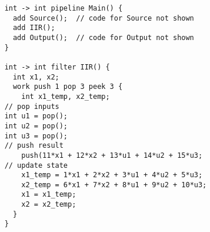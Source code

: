 \begin{singlespace}
\vspace{-12pt}
\begin{scriptsize}
\begin{verbatim}
    int -> int pipeline Main() {
      add Source();  // code for Source not shown
      add IIR();
      add Output();  // code for Output not shown
    }

    int -> int filter IIR() {
      int x1, x2;
      work push 1 pop 3 peek 3 {
        int x1_temp, x2_temp;
	// pop inputs
	int u1 = pop();
	int u2 = pop();
	int u3 = pop();
	// push result
        push(11*x1 + 12*x2 + 13*u1 + 14*u2 + 15*u3;
	// update state
        x1_temp = 1*x1 + 2*x2 + 3*u1 + 4*u2 + 5*u3;
        x2_temp = 6*x1 + 7*x2 + 8*u1 + 9*u2 + 10*u3;
        x1 = x1_temp;
        x2 = x2_temp;
      }
    }
\end{verbatim}
\end{scriptsize}
\vspace{-12pt}
\end{singlespace}
